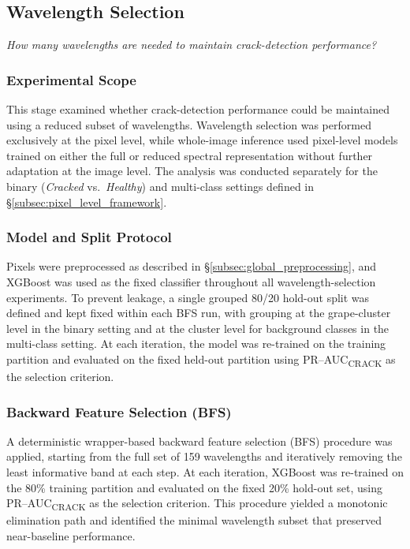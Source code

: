\subsection{Wavelength Selection}
\label{subsec:wavelength_selection}

\noindent
\textit{How many wavelengths are needed to maintain crack-detection performance?}

\subsubsection{Experimental Scope}

\medskip
\noindent
This stage examined whether crack-detection performance could be maintained using a reduced subset of wavelengths. Wavelength selection was performed exclusively at the pixel level, while whole-image inference used pixel-level models trained on either the full or reduced spectral representation without further adaptation at the image level. The analysis was conducted separately for the binary (\textit{Cracked} vs.\ \textit{Healthy}) and multi-class settings defined in \S\ref{subsec:pixel_level_framework}.
\subsubsection{Model and Split Protocol}

\medskip
\noindent
Pixels were preprocessed as described in \S\ref{subsec:global_preprocessing}, and XGBoost was used as the fixed classifier throughout all wavelength-selection experiments. To prevent leakage, a single grouped 80/20 hold-out split was defined and kept fixed within each BFS run, with grouping at the grape-cluster level in the binary setting and at the cluster level for background classes in the multi-class setting. At each iteration, the model was re-trained on the training partition and evaluated on the fixed held-out partition using PR--AUC\textsubscript{CRACK} as the selection criterion.

\subsubsection{Backward Feature Selection (BFS)}

\noindent
A deterministic wrapper-based backward feature selection (BFS) procedure was applied, starting from the full set of 159 wavelengths and iteratively removing the least informative band at each step. At each iteration, XGBoost was re-trained on the 80\% training partition and evaluated on the fixed 20\% hold-out set, using PR--AUC\textsubscript{CRACK} as the selection criterion. This procedure yielded a monotonic elimination path and identified the minimal wavelength subset that preserved near-baseline performance.

